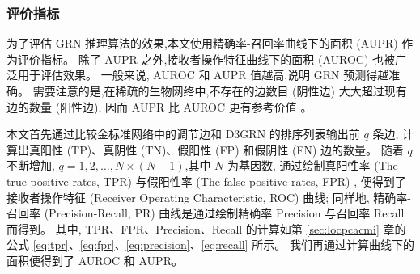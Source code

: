 \begin{table}[!htbp]
\centering
\caption{实验数据集详情}

\label{datasets}
\end{table}

\subsubsection{评价指标}

为了评估 GRN 推理算法的效果,本文使用精确率-召回率曲线下的面积 (AUPR) 作为评价指标。
除了 AUPR 之外,接收者操作特征曲线下的面积 (AUROC) 也被广泛用于评估效果。
一般来说, AUROC 和 AUPR 值越高,说明 GRN 预测得越准确。
需要注意的是,在稀疏的生物网络中,不存在的边数目 (阴性边) 大大超过现有边的数量 (阳性边),
因而 AUPR 比 AUROC 更有参考价值 \cite{saito2015precision} 。

本文首先通过比较金标准网络中的调节边和 D3GRN 的排序列表输出前 $q$ 条边,
计算出真阳性 (TP)、真阴性 (TN)、假阳性 (FP) 和假阴性 (FN) 边的数量。
随着 $q$ 不断增加, $q = 1,2,\ldots,N\times(N-1)$,其中 $N$ 为基因数,
通过绘制真阳性率 (The true positive rates, TPR) 与假阳性率 (The false positive rates, FPR) ,
便得到了接收者操作特征 (Receiver Operating Characteristic, ROC) 曲线; 
同样地,
精确率-召回率 (Precision-Recall, PR) 曲线是通过绘制精确率 Precision 与召回率 Recall 而得到。
其中, TPR、FPR、Precision、Recall 的计算如第 \ref{sec:locpcacmi} 章的公式 \ref{eq:tpr}、\ref{eq:fpr}、\ref{eq:precision}、\ref{eq:recall} 所示。
我们再通过计算曲线下的面积便得到了 AUROC 和 AUPR。


